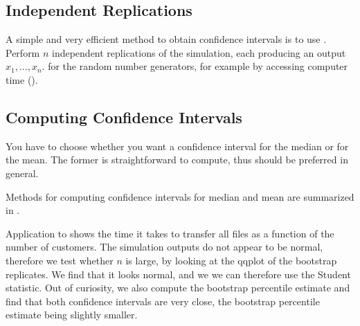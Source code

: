 \subsection{Independent Replications}
A simple and very efficient method to obtain confidence intervals
is to use . Perform $n$ independent replications
of the simulation, each producing an output $x_1, ...,x_n$.  for the random number
generators, for example by accessing computer time
().

\subsection{Computing Confidence Intervals}
You have to choose whether you want a confidence interval for the
median or for the mean. The former is straightforward to compute,
thus should be preferred in general.

Methods for computing confidence intervals for median and mean
are summarized in .
\begin{ex}{Application to } 
shows the time it takes to transfer all files as a function of the number
of customers. The simulation outputs do not appear to be normal,
therefore we test whether $n$ is large, by looking at the qqplot
of the bootstrap replicates. We find that it looks normal, and we
we can therefore use the Student statistic. Out of curiosity, we also compute
the bootstrap percentile estimate and find that both confidence
intervals are very close, the bootstrap percentile estimate being
slightly smaller.
\end{ex}
\begin{figure}[!htb]
\begin{center}

\end{center} 
\end{figure}


